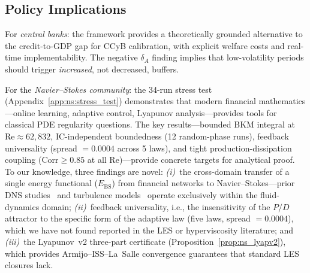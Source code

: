 \documentclass[final]{siamltex}
\begin{document}
\subsection{Policy Implications}

For \emph{central banks}: the framework provides a theoretically
grounded alternative to the credit-to-GDP gap for CCyB calibration,
with explicit welfare costs and real-time implementability.
The negative $\delta_A$ finding implies that low-volatility periods
should trigger \emph{increased}, not decreased, buffers.

For the \emph{Navier--Stokes community}: the 34-run stress test
(Appendix~\ref{app:ns:stress_test}) demonstrates that modern
financial mathematics---online learning, adaptive control,
Lyapunov analysis---provides tools for classical PDE regularity
questions.  The key results---bounded BKM integral at
$\mathrm{Re}\approx 62{,}832$, IC-independent boundedness
(12 random-phase runs), feedback universality
(spread $= 0.0004$ across 5 laws), and tight
production-dissipation coupling ($\mathrm{Corr} \ge 0.85$
at all Re)---provide concrete targets for analytical proof.
To our knowledge, three findings are novel:
\emph{(i)}~the cross-domain transfer of a single energy functional
($E_{\mathrm{BS}}$) from financial networks to
Navier--Stokes---prior DNS studies~\cite{kerr1993,houli2006}
and turbulence models~\cite{smagorinsky1963,germano1991}
operate exclusively within the fluid-dynamics domain;
\emph{(ii)}~feedback universality, i.e., the insensitivity of
the $P/D$ attractor to the specific form of the adaptive law
(five laws, spread $= 0.0004$), which we have not found
reported in the LES or hyperviscosity literature;
and \emph{(iii)}~the Lyapunov~v2 three-part certificate
(Proposition~\ref{prop:ns_lyapv2}), which provides
Armijo--ISS--La~Salle convergence guarantees that standard
LES closures lack.
\end{document}
